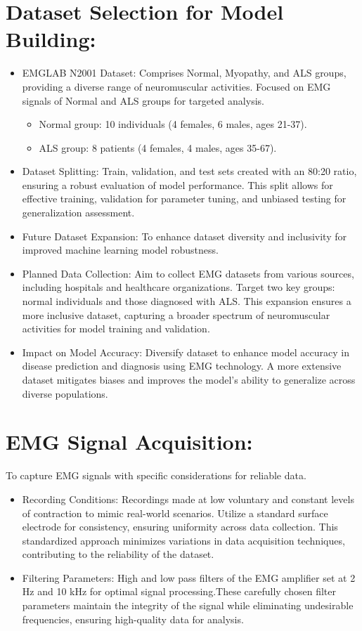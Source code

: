 \documentclass[ 12pt,a4paper,twocolumn,fleqn]{report}
\begin{document}
\section{Dataset Selection for Model Building:}
\vspace{2mm}
\begin{itemize}
    \item EMGLAB N2001 Dataset: Comprises Normal, Myopathy, and ALS groups, providing a
diverse range of neuromuscular activities. Focused on EMG signals of Normal and ALS groups
for targeted analysis.
\begin{itemize}
    \item Normal group: 10 individuals (4 females, 6 males, ages 21-37).
\item  ALS group: 8 patients (4 females, 4 males, ages 35-67).

\end{itemize}
\item Dataset Splitting: Train, validation, and test sets created with an 80:20 ratio, ensuring a
robust evaluation of model performance. This split allows for effective training, validation for
parameter tuning, and unbiased testing for generalization assessment.
\item Future Dataset Expansion: To enhance dataset diversity and inclusivity for improved
machine learning model robustness.
\item Planned Data Collection: Aim to collect EMG datasets from various sources, including
hospitals and healthcare organizations. Target two key groups: normal individuals and those
diagnosed with ALS. This expansion ensures a more inclusive dataset, capturing a broader
spectrum of neuromuscular activities for model training and validation.
\item Impact on Model Accuracy: Diversify dataset to enhance model accuracy in disease
prediction and diagnosis using EMG technology. A more extensive dataset mitigates
biases and improves the model's ability to generalize across diverse populations.
\end{itemize}
\newpage
  \pagestyle{fancy}
\thisfancypage{%
  \setlength{\fboxsep}{20pt}\doublebox}{}
\normalsize
\section{EMG Signal Acquisition:}
\vspace{2mm}
To capture EMG signals with specific considerations for reliable data.
\begin{itemize}
    \item Recording Conditions: Recordings made at low voluntary and constant levels of
contraction to mimic real-world scenarios. Utilize a standard surface electrode for consistency,
ensuring uniformity across data collection. This standardized approach minimizes variations in
data acquisition techniques, contributing to the reliability of the dataset.
\item Filtering Parameters: High and low pass filters of the EMG amplifier set at 2 Hz and 10
kHz for optimal signal processing.These carefully chosen filter parameters maintain the
integrity of the signal while eliminating undesirable frequencies, ensuring high-quality data for
analysis.
\end{itemize}
\end{document}
